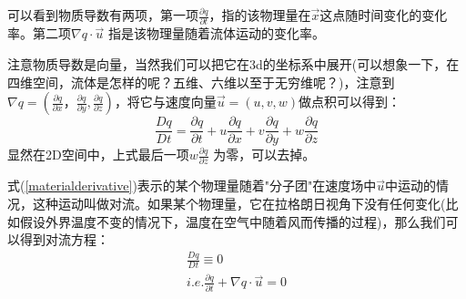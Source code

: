 \documentclass{article}
\begin{document}
可以看到物质导数有两项，第一项$\frac{\partial{q}}{\partial{t}}$，指的该物理量在$\vec{x}$这点随时间变化的变化率。第二项$\nabla{q}\cdot\vec{u}$ 指是该物理量随着流体运动的变化率。\par
注意物质导数是向量，当然我们可以把它在3d的坐标系中展开(可以想象一下，在四维空间，流体是怎样的呢？五维、六维以至于无穷维呢？)，注意到$\nabla{q}=(\frac{\partial{q}}{\partial{x}}，\frac{\partial{q}}{\partial{y}},\frac{\partial{q}}{\partial{z}})$，将它与速度向量$\vec{u}=(u,v,w)$做点积可以得到：
\begin{equation}
\frac{Dq}{Dt}=\frac{\partial{q}}{\partial{t}}
                +u\frac{\partial{q}}{\partial{x}}
                +v\frac{\partial{q}}{\partial{y}}
                +w\frac{\partial{q}}{\partial{z}} \label{materialderivative}
\end{equation}
显然在2D空间中，上式最后一项$w\frac{\partial{q}}{\partial{z}}$ 为零，可以去掉。\par
式(\ref{materialderivative})表示的某个物理量随着"分子团"在速度场中$\vec{u}$中运动的情况，这种运动叫做对流。如果某个物理量，它在拉格朗日视角下没有任何变化(比如假设外界温度不变的情况下，温度在空气中随着风而传播的过程)，那么我们可以得到对流方程：
\begin{equation}
\begin{aligned}
\frac{Dq}{Dt}\equiv{0} \\
i.e. \frac{\partial{q}}{\partial{t}}+\nabla{q}\cdot\vec{u}=0
\end{aligned}
\end{equation}
\end{document}
